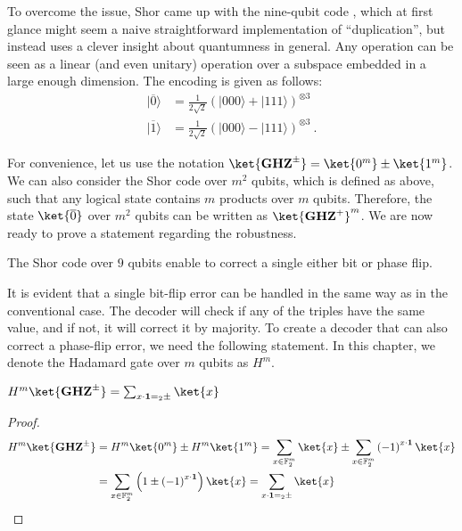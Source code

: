 \documentclass[12pt,a4paper]{article}
\begin{document}
To overcome the issue, Shor came up with the nine-qubit code \cite{Ninequ}, which at first glance might seem a naive straightforward implementation of ``duplication'', but instead uses a clever insight about quantumness in general. Any operation can be seen as a linear (and even unitary) operation over a subspace embedded in a large enough dimension. The encoding is given as follows: 
\begin{equation*}
  \begin{split}
    |\overline{0}\rangle&=\frac{1}{2\sqrt{2}}\left(|000\rangle+|111\rangle\right)^{\otimes3}\\
    |\overline{1}\rangle&=\frac{1}{2\sqrt{2}}\left(|000\rangle-|111\rangle\right)^{\otimes3}~.
  \end{split}
\end{equation*}


For convenience, let us use the notation $\ket{\mathbf{GHZ}^{\pm}} =  \ket{0^{m}} \pm  \ket{1^{m}}$. We can also consider the Shor code over $m^{2}$ qubits, which is defined as above, such that any logical state contains $m$ products over $m$ qubits. Therefore, the state $\ket{\overline{0}}$ over $m^{2}$ qubits can be written as $\ket{\mathbf{GHZ}^{+}}^{m}$. We are now ready to prove a statement regarding the robustness.
\begin{lemma}
  The Shor code over $9$ qubits enable to correct a single either bit or phase flip.  
\end{lemma}
It is evident that a single bit-flip error can be handled in the same way as in the conventional case. The decoder will check if any of the triples have the same value, and if not, it will correct it by majority. To create a decoder that can also correct a phase-flip error, we need the following statement. In this chapter, we denote the Hadamard gate over $m$ qubits as $H^m$.
\begin{claim}
   $H^{m}\ket{\mathbf{GHZ}^{\pm}} = \sum_{ x \cdot \mathbf{1} =_2 \pm }{\ket{x} }$
\end{claim}

\begin{proof}

  \begin{equation*}
    \begin{split}
      H^{m}\ket{\mathbf{GHZ}^{\pm}} & = H^{m}\ket{0^{m}} \pm  H^{m}\ket{1^{m}} = \sum_{x \in \mathbb{F}_{2}^{m}}{\ket{x}} \pm  \sum_{x \in \mathbb{F}_{2}^{m}}{\left( -1 \right)^{x \cdot \mathbf{1}} \ket{x}} \\ & = \sum_{x \in \mathbb{F}_{2}^{m}}{ \left( 1 \pm \left( -1 \right)^{x \cdot \mathbf{1}}  \right) \ket{x} } =  \sum_{x \cdot \mathbf{1} =_2 \pm }{\ket{x} }
    \end{split}
  \end{equation*}
\end{proof}
\end{document}

